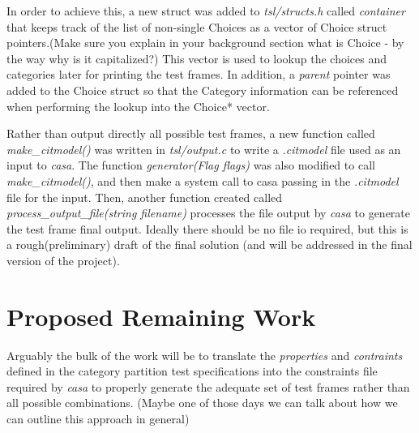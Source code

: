 \documentclass[a4full,12pt]{article}
\newcommand{\eas}[1]{{\color{blue}\sf ({#1})}}
\begin{document}
  In order to achieve this, a new struct was added to \emph{tsl/structs.h} called \emph{container} that
  keeps track of the list of non-single Choices as a vector of Choice struct
  pointers.\eas{Make sure you explain in your background section what is Choice - by the way why is it capitalized?} This vector is used to lookup the choices and categories later for
  printing the test frames. In addition, a \emph{parent} pointer was added to
  the Choice struct so that the Category information can be referenced when
  performing the lookup into the Choice* vector.
  
Rather than output directly all possible test frames, a new function called
  \emph{make\_citmodel()} was written in \emph{tsl/output.c} to write a 
  \emph{.citmodel} file used as an input to \emph{casa}. The function
  \emph{generator(Flag flags)} was also modified to call \emph{make\_citmodel()},
  and then make a system call to casa passing in the \emph{.citmodel} file for
  the input. Then, another function created  called
  \emph{process\_output\_file(string filename)} processes the file output by
  \emph{casa} to generate the test frame final output. Ideally there should be
  no file io required, but this is a rough\eas{preliminary} draft of the final solution \eas{and will be addressed in the final version of the project}.
  
  \section{Proposed Remaining Work}
Arguably the bulk of the work will be to translate the \emph{properties} and 
  \emph{contraints} defined in the category partition test specifications into
  the constraints file required by \emph{casa} to properly generate the adequate
  set of test frames rather than all possible combinations. \eas{Maybe one of those days we can talk about how we can outline this approach in general}
\end{document}
